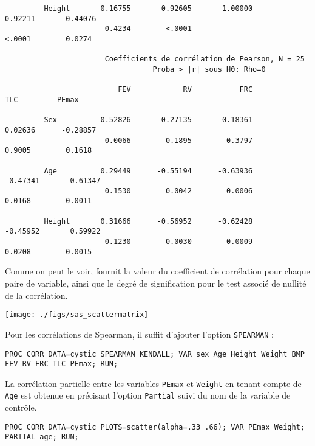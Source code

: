 \begin{verbatim}
         Height      -0.16755       0.92605       1.00000       0.92211       0.44076
                       0.4234        <.0001                      <.0001        0.0274

                       Coefficients de corrélation de Pearson, N = 25
                                  Proba > |r| sous H0: Rho=0

                          FEV            RV           FRC           TLC         PEmax

         Sex         -0.52826       0.27135       0.18361       0.02636      -0.28857
                       0.0066        0.1895        0.3797        0.9005        0.1618

         Age          0.29449      -0.55194      -0.63936      -0.47341       0.61347
                       0.1530        0.0042        0.0006        0.0168        0.0011

         Height       0.31666      -0.56952      -0.62428      -0.45952       0.59922
                       0.1230        0.0030        0.0009        0.0208        0.0015
\end{verbatim}
Comme on peut le voir, \SAS fournit la valeur du coefficient de corrélation
pour chaque paire de variable, ainsi que le degré de signification pour le
test associé de nullité de la corrélation.

\texttt{[image: ./figs/sas\_scattermatrix]}

Pour les corrélations de Spearman, il suffit d'ajouter l'option \texttt{SPEARMAN} :
\begin{verbatim}
PROC CORR DATA=cystic SPEARMAN KENDALL; VAR sex Age Height Weight BMP FEV RV FRC TLC PEmax; RUN;
\end{verbatim}


La corrélation partielle entre les variables \texttt{PEmax} et
\texttt{Weight} en tenant compte de \texttt{Age} est obtenue en précisant
l'option \texttt{Partial} suivi du nom de la variable de contrôle.
\begin{verbatim}
PROC CORR DATA=cystic PLOTS=scatter(alpha=.33 .66); VAR PEmax Weight; PARTIAL age; RUN;
\end{verbatim}

